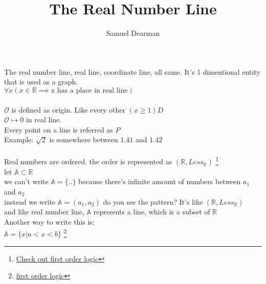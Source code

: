 \documentclass{article}
\title{The Real Number Line}
\author{Samuel Dearman}
\theoremstyle{mytheoremstyle}
\theoremstyle{mytheoremstyle}
\theoremstyle{myproblemstyle}
\begin{document}
    \maketitle
    The real number line, real line, coordinate line, all same. It's 1 dimentional entity that is used as a graph. \\ 
  $\forall x (x \in \mathbb{R} \implies \text{x has a place in real line})$ \\ \\ 
  $  \mathcal{O}$ is defined as origin. Like every other $(x \geq 1)D$ \\ 
  $ \mathcal{O} \mapsto 0 $ in real line. \\ 
  Every point on a line is referred as $P$ \\ 
  Example:   $\sqrt{2}$ is somewhere between $1.41$ and $1.42$ 
  \\ 
  \\ 
  Real numbers are ordered. the order is represented as $(\mathbb{R}, Less_{\mathbb{R}})$ \footnote{\href{url:///home/uhh/_Documents/existence/Existence/lang/logic/first_order_logic/}{Check out first order logic}} \\ %
  let  $\mathbb{A} \subset \mathbb{R}$ \\ 
  we can't write $\mathbb{A}= \{..\}$ because there's infinite amount of numbers between $a_1$ and $a_2$ \\ 
instead we write $\mathbb{A} = (a_1,a_2)$  do you see the pattern? It's like $(\mathbb{R}, Less_{\mathbb{R}})$ \\ 
and like real number line, $\mathbb{A}$ represents a line, which is a subset of $\mathbb{R}$ \\ 
Another way to write this is; \\ 
$\mathbb{A} = \{x | a < x < b \}$ \footnote{\href{}{first order logic}}


  
\end{document}
